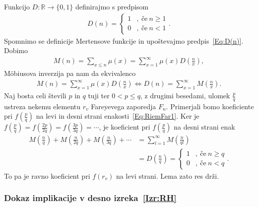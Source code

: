 \documentclass[mat1]{fmfdelo}
\begin{document}
\begin{dokaz}
Funkcijo $D: \mathbb{R} \to \{0,1\}$ definirajmo s predpisom
\begin{align}
\label{Eq:D(n)}
D(n) = \left\{
\begin{array}{rl}
	1 &,\ \textrm{če}\ n \geq 1 \\
	0 &,\ \textrm{če}\ n < 1
\end{array}.
\right.
\end{align}
Spomnimo se definicije Mertensove funkcije in upoštevajmo predpis~\eqref{Eq:D(n)}. Dobimo
\begin{align*}
M(n) = \sum_{x \leq n} \mu(x) = \sum_{x=1}^{\infty} \mu(x) D \left( \frac{n}{x} \right),
\end{align*}
M\"obiusova inverzija pa nam da ekvivalenco
\begin{align*}
M(n) = \sum_{x=1}^{\infty} \mu(x) D \left( \frac{n}{x} \right) \Longleftrightarrow
D(n) = \sum_{x=1}^{\infty} M \left( \frac{n}{x} \right).
\end{align*}
Naj bosta celi števili $p$ in $q$ tuji ter $0 < p \leq q$, z drugimi besedami, ulomek $\frac{p}{q}$ ustreza nekemu elementu $r_{v}$ Fareyevega zaporedja $F_{n}$.
Primerjali bomo koeficiente pri $f(\frac{p}{q})$ na levi in desni strani enakosti~\eqref{Eq:RiemFar1}.
Ker je $ f(\frac{p}{q}) = f(\frac{2p}{2q}) = f(\frac{3p}{3q}) = \cdots $, je koeficient pri $f(\frac{p}{q})$ na desni strani enak 
%
\begin{align*}
M \left(\frac{n}{q} \right) + M \left(\frac{n}{2q} \right) + M \left(\frac{n}{3q} \right) + \cdots &= \sum_{l=1}^{\infty} M \left(\frac{n}{ql} \right) \\
&= D \left(\frac{n}{q} \right) = \left\{
\begin{array}{rl}
	1 &,\ \textrm{če}\ n \geq q \\
	0 &,\ \textrm{če}\ n < q
\end{array}.
\right.
\end{align*}
%
To pa je ravno koeficient pri $f(r_{v})$ na levi strani. Lema zato res drži.
%
\end{dokaz}

\subsubsection{Dokaz implikacije v desno izreka~\ref{Izr:RH}}
\end{document}
